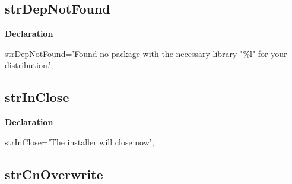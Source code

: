 \documentclass{report}
\newif\ifpdf
\begin{document}
\subsection*{strDepNotFound}
\fi
\label{trstrings-strDepNotFound}
\begin{list}{}{
\setlength{\itemindent}{0cm}
\setlength{\listparindent}{0cm}
\setlength{\leftmargin}{\evensidemargin}
\addtolength{\leftmargin}{\tmplength}
\settowidth{\labelsep}{X}
\addtolength{\leftmargin}{\labelsep}
\setlength{\labelwidth}{\tmplength}
}
\item[\textbf{Declaration}\hfill]
\ifpdf
\begin{flushleft}
\fi
\begin{ttfamily}
strDepNotFound='Found no package with the necessary library "{\%}l" for your distribution.';\end{ttfamily}

\ifpdf
\end{flushleft}
\fi

\end{list}
\ifpdf
\subsection*{\large{\textbf{strInClose}}\normalsize\hspace{1ex}\hrulefill}
\else
\subsection*{strInClose}
\fi
\label{trstrings-strInClose}
\begin{list}{}{
\setlength{\itemindent}{0cm}
\setlength{\listparindent}{0cm}
\setlength{\leftmargin}{\evensidemargin}
\addtolength{\leftmargin}{\tmplength}
\settowidth{\labelsep}{X}
\addtolength{\leftmargin}{\labelsep}
\setlength{\labelwidth}{\tmplength}
}
\item[\textbf{Declaration}\hfill]
\ifpdf
\begin{flushleft}
\fi
\begin{ttfamily}
strInClose='The installer will close now';\end{ttfamily}

\ifpdf
\end{flushleft}
\fi

\end{list}
\ifpdf
\subsection*{\large{\textbf{strCnOverwrite}}\normalsize\hspace{1ex}\hrulefill}
\else
\end{document}

